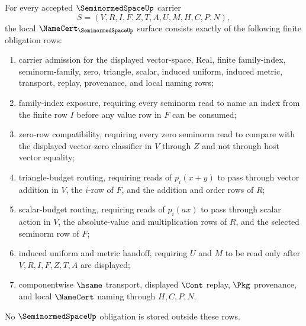 
\begin{theorem}
\label{thm:seminormed-space-namecert-obligations}
For every accepted $\SeminormedSpaceUp$ carrier
$$
S=(V,R,I,F,Z,T,A,U,M,H,C,P,N),
$$
the local $\NameCert_{\SeminormedSpaceUp}$ surface consists exactly of the following finite obligation rows:
\begin{enumerate}
\item carrier admission for the displayed vector-space, Real, finite family-index, seminorm-family, zero, triangle, scalar, induced uniform, induced metric, transport, replay, provenance, and local naming rows;
\item family-index exposure, requiring every seminorm read to name an index from the finite row $I$ before any value row in $F$ can be consumed;
\item zero-row compatibility, requiring every zero seminorm read to compare with the displayed vector-zero classifier in $V$ through $Z$ and not through host vector equality;
\item triangle-budget routing, requiring reads of $p_i(x+y)$ to pass through vector addition in $V$, the $i$-row of $F$, and the addition and order rows of $R$;
\item scalar-budget routing, requiring reads of $p_i(ax)$ to pass through scalar action in $V$, the absolute-value and multiplication rows of $R$, and the selected seminorm row of $F$;
\item induced uniform and metric handoff, requiring $U$ and $M$ to be read only after $V,R,I,F,Z,T,A$ are displayed;
\item componentwise $\hsame$ transport, displayed $\Cont$ replay, $\Pkg$ provenance, and local $\NameCert$ naming through $H,C,P,N$.
\end{enumerate}
No $\SeminormedSpaceUp$ obligation is stored outside these rows.
\end{theorem}
